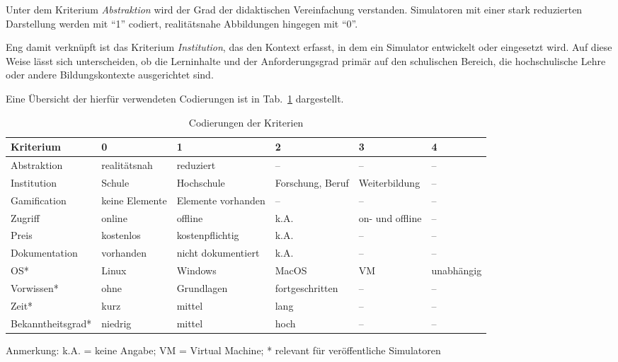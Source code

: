 Unter dem Kriterium \textit{Abstraktion} wird der Grad der didaktischen Vereinfachung verstanden. Simulatoren mit einer stark reduzierten Darstellung werden mit \enquote{1} codiert, realitätsnahe Abbildungen hingegen mit \enquote{0}. 

Eng damit verknüpft ist das Kriterium \textit{Institution}, das den Kontext erfasst, in dem ein Simulator entwickelt oder eingesetzt wird. Auf diese Weise lässt sich unterscheiden, ob die Lerninhalte und der Anforderungsgrad primär auf den schulischen Bereich, die hochschulische Lehre oder andere Bildungskontexte ausgerichtet sind.

Eine Übersicht der hierfür verwendeten Codierungen ist in Tab.~\ref{tab:legende_codierung} dargestellt.

\begin{table}[h]
  \centering
  \caption{Codierungen der Kriterien}
  \label{tab:legende_codierung}
  \tiny
  \begin{tabularx}{\textwidth}{p{2cm}p{1.5cm}p{1.7cm}p{1.7cm}p{1.5cm}p{1.5cm}}
    \toprule
    \textbf{Kriterium} & \textbf{0} & \textbf{1} & \textbf{2} & \textbf{3} & \textbf{4} \\
    \midrule
    Abstraktion       & realitätsnah & reduziert & -- & -- & -- \\
    Institution       & Schule & Hochschule & Forschung, Beruf & Weiterbildung & -- \\
    Gamification      & keine Elemente & Elemente vorhanden & -- & -- & -- \\
    Zugriff           & online & offline & k.A. & on- und offline & -- \\
    Preis             & kostenlos & kostenpflichtig & k.A. & -- & -- \\
    Dokumentation     & vorhanden & nicht dokumentiert & k.A. & -- & -- \\
    OS*                & Linux & Windows & MacOS & VM & unabhängig \\
    Vorwissen*         & ohne & Grundlagen & fortgeschritten & -- & -- \\
    Zeit* & kurz & mittel & lang & -- & -- \\
    Bekanntheitsgrad*  & niedrig & mittel & hoch & -- & -- \\
    \bottomrule
  \end{tabularx}
  \vspace{0.5em}
  {\tiny Anmerkung: k.A. = keine Angabe; VM = Virtual Machine; * relevant für veröffentliche Simulatoren}
\end{table}

